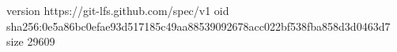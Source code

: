 version https://git-lfs.github.com/spec/v1
oid sha256:0e5a86bc0efae93d517185c49aa88539092678acc022bf538fba858d3d0463d7
size 29609

